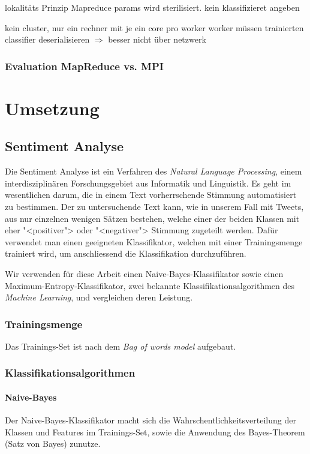 \documentclass[12pt, oneside]{report}   	%
\begin{document}
lokalitäts Prinzip Mapreduce params wird sterilisiert. kein klassifizieret angeben

kein cluster, nur ein rechner mit je ein  core pro worker
worker müssen trainierten classifier deserialisieren $\Rightarrow$ besser nicht über netzwerk
\subsection{Evaluation MapReduce vs. MPI}

\chapter{Umsetzung}

\section{Sentiment Analyse}
Die Sentiment Analyse ist ein Verfahren des \emph{Natural Language Processing}, einem interdisziplinären Forschungsgebiet aus Informatik und Linguistik.
Es geht im wesentlichen darum, die in einem Text vorherrschende Stimmung automatisiert zu bestimmen. 
Der zu untersuchende Text kann, wie in unserem Fall mit Tweets, aus nur einzelnen wenigen Sätzen bestehen, welche einer der beiden Klassen mit eher "<positiver"> oder "<negativer"> Stimmung zugeteilt werden.
Dafür verwendet man einen geeigneten Klassifikator, welchen  mit einer Trainingsmenge trainiert wird, um anschliessend die Klassifikation durchzuführen. 

Wir verwenden für diese Arbeit einen Naive-Bayes-Klassifikator sowie einen Maximum-Entropy-Klassifikator, zwei bekannte Klassifikationsalgorithmen des \emph{Machine Learning}, und vergleichen deren Leistung.


\subsection{Trainingsmenge}
Das Trainings-Set ist nach dem \emph{Bag of words model} aufgebaut.

\subsection{Klassifikationsalgorithmen}
\subsubsection{Naive-Bayes}

Der Naive-Bayes-Klassifikator macht sich die Wahrschentlichkeitsverteilung der Klassen und Features im Trainings-Set, sowie die Anwendung des Bayes-Theorem (Satz von Bayes) zunutze.
\end{document}
